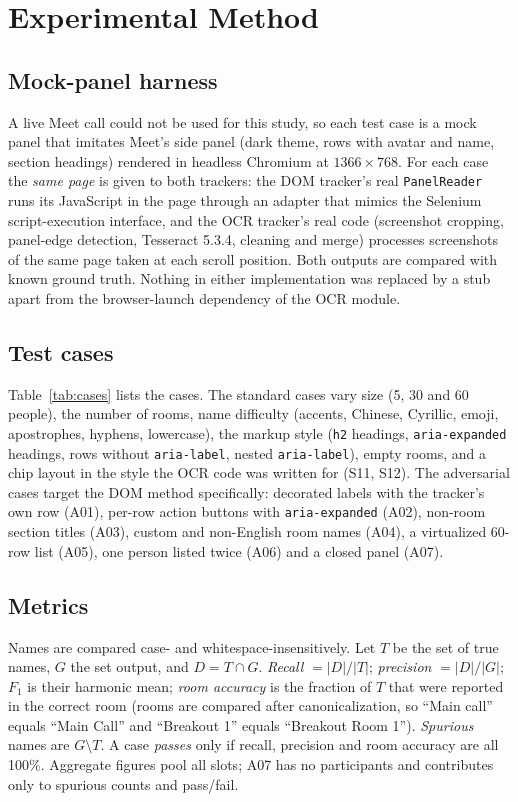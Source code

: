 \documentclass[conference]{IEEEtran}
\begin{document}
\section{Experimental Method}\label{sec:method}
\subsection{Mock-panel harness}
A live Meet call could not be used for this study, so each test case is a mock panel that imitates Meet's side panel (dark theme, rows with avatar and name, section headings) rendered in headless Chromium at $1366\times768$. For each case the \emph{same page} is given to both trackers: the DOM tracker's real \texttt{PanelReader} runs its JavaScript in the page through an adapter that mimics the Selenium script-execution interface, and the OCR tracker's real code (screenshot cropping, panel-edge detection, Tesseract 5.3.4, cleaning and merge) processes screenshots of the same page taken at each scroll position. Both outputs are compared with known ground truth. Nothing in either implementation was replaced by a stub apart from the browser-launch dependency of the OCR module.

\subsection{Test cases}
Table~\ref{tab:cases} lists the \nCases{} cases. The \nStd{} standard cases vary size (5, 30 and 60 people), the number of rooms, name difficulty (accents, Chinese, Cyrillic, emoji, apostrophes, hyphens, lowercase), the markup style (\texttt{h2} headings, \texttt{aria-expanded} headings, rows without \texttt{aria-label}, nested \texttt{aria-label}), empty rooms, and a chip layout in the style the OCR code was written for (S11, S12). The \nAdv{} adversarial cases target the DOM method specifically: decorated labels with the tracker's own row (A01), per-row action buttons with \texttt{aria-expanded} (A02), non-room section titles (A03), custom and non-English room names (A04), a virtualized 60-row list (A05), one person listed twice (A06) and a closed panel (A07).

\subsection{Metrics}
Names are compared case- and whitespace-insensitively. Let $T$ be the set of true names, $G$ the set output, and $D=T\cap G$. \emph{Recall} $=|D|/|T|$; \emph{precision} $=|D|/|G|$; $F_1$ is their harmonic mean; \emph{room accuracy} is the fraction of $T$ that were reported in the correct room (rooms are compared after canonicalization, so ``Main call'' equals ``Main Call'' and ``Breakout 1'' equals ``Breakout Room 1''). \emph{Spurious} names are $G\setminus T$. A case \emph{passes} only if recall, precision and room accuracy are all 100\%. Aggregate figures pool all slots; A07 has no participants and contributes only to spurious counts and pass/fail.
\end{document}
